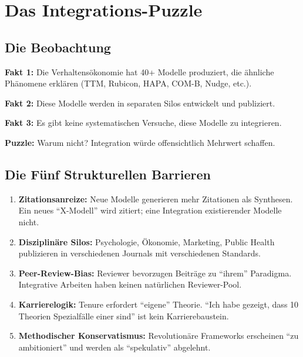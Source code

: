 \documentclass[12pt,a4paper]{article}
\begin{document}
\section{Das Integrations-Puzzle}

\subsection{Die Beobachtung}

\begin{tcolorbox}[colback=gray!5!white, colframe=gray!75!black]
\textbf{Fakt 1:} Die Verhaltensökonomie hat 40+ Modelle produziert, die ähnliche
Phänomene erklären (TTM, Rubicon, HAPA, COM-B, Nudge, etc.).

\textbf{Fakt 2:} Diese Modelle werden in separaten Silos entwickelt und publiziert.

\textbf{Fakt 3:} Es gibt keine systematischen Versuche, diese Modelle zu integrieren.

\textbf{Puzzle:} Warum nicht? Integration würde offensichtlich Mehrwert schaffen.
\end{tcolorbox}

\subsection{Die Fünf Strukturellen Barrieren}

\begin{enumerate}
\item \textbf{Zitationsanreize:} Neue Modelle generieren mehr Zitationen als Synthesen.
      Ein neues ``X-Modell'' wird zitiert; eine Integration existierender Modelle nicht.

\item \textbf{Disziplinäre Silos:} Psychologie, Ökonomie, Marketing, Public Health
      publizieren in verschiedenen Journals mit verschiedenen Standards.

\item \textbf{Peer-Review-Bias:} Reviewer bevorzugen Beiträge zu ``ihrem'' Paradigma.
      Integrative Arbeiten haben keinen natürlichen Reviewer-Pool.

\item \textbf{Karrierelogik:} Tenure erfordert ``eigene'' Theorie.
      ``Ich habe gezeigt, dass 10 Theorien Spezialfälle einer sind'' ist kein Karrierebaustein.

\item \textbf{Methodischer Konservatismus:} Revolutionäre Frameworks erscheinen
      ``zu ambitioniert'' und werden als ``spekulativ'' abgelehnt.
\end{enumerate}
\end{document}
